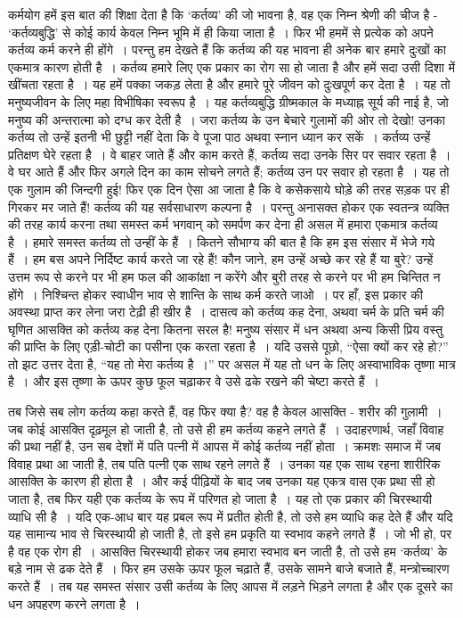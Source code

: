 कर्मयोग हमें इस बात की शिक्षा देता है कि ‘कर्तव्य’ की जो भावना है, वह एक निम्न श्रेणी की चीज है - ‘कर्तव्यबुद्धि’ से कोई कार्य केवल निम्न भूमि में ही किया जाता है~। फिर भी हममें से प्रत्येक को अपने कर्तव्य कर्म करने ही होंगे~। परन्तु हम देखते हैं कि कर्तव्य की यह भावना ही अनेक बार हमारे दुःखों का एकमात्र कारण होती है~। कर्तव्य हमारे लिए एक प्रकार का रोग सा हो जाता है और हमें सदा उसी दिशा में खींचता रहता है~। यह हमें पक्का जकड़ लेता है और हमारे पूरे जीवन को दुःखपूर्ण कर देता है~। यह तो मनुष्यजीवन के लिए महा विभीषिका स्वरूप है~। यह कर्तव्यबुद्धि ग्रीष्मकाल के मध्याह्न सूर्य की नाई है, जो मनुष्य की अन्तरात्मा को दग्ध कर देती है~। जरा कर्तव्य के उन बेचारे गुलामों की ओर तो देखो! उनका कर्तव्य तो उन्हें इतनी भी छुट्टी नहीं देता कि वे पूजा पाठ अथवा स्नान ध्यान कर सकें~। कर्तव्य उन्हें प्रतिक्षण घेरे रहता है~। वे बाहर जाते हैं और काम करते हैं, कर्तव्य सदा उनके सिर पर सवार रहता है~। वे घर आते हैं और फिर अगले दिन का काम सोचने लगते हैं; कर्तव्य उन पर सवार हो रहता है~। यह तो एक गुलाम की जिन्दगी हुई! फिर एक दिन ऐसा आ जाता है कि वे कसेकसाये घोड़े की तरह सड़क पर ही गिरकर मर जाते हैं! कर्तव्य की यह सर्वसाधारण कल्पना है~। परन्तु अनासक्त होकर एक स्वतन्त्र व्यक्ति की तरह कार्य करना तथा समस्त कर्म भगवान् को समर्पण कर देना ही असल में हमारा एकमात्र कर्तव्य है~। हमारे समस्त कर्तव्य तो उन्हीं के हैं~। कितने सौभाग्य की बात है कि हम इस संसार में भेजे गये हैं~। हम बस अपने निर्दिष्ट कार्य करते जा रहे हैं! कौन जाने, हम उन्हें अच्छे कर रहे हैं या बुरे? उन्हें उत्तम रूप से करने पर भी हम फल की आकांक्षा न करेंगे और बुरी तरह से करने पर भी हम चिन्तित न होंगे~। निश्चिन्त होकर स्वाधीन भाव से शान्ति के साथ कर्म करते जाओ~। पर हाँ, इस प्रकार की अवस्था प्राप्त कर लेना जरा टेढ़ी ही खीर है~। दासत्व को कर्तव्य कह देना, अथवा चर्म के प्रति चर्म की घृणित आसक्ति को कर्तव्य कह देना कितना सरल है! मनुष्य संसार में धन अथवा अन्य किसी प्रिय वस्तु की प्राप्ति के लिए एड़ी-चोटी का पसीना एक करता रहता है~। यदि उससे पूछो, “ऐसा क्यों कर रहे हो?” तो झट उत्तर देता है, “यह तो मेरा कर्तव्य है~।” पर असल में यह तो धन के लिए अस्वाभाविक तृष्णा मात्र है~। और इस तृष्णा के ऊपर कुछ फूल चढ़ाकर वे उसे ढके रखने की चेष्टा करते हैं~।

तब जिसे सब लोग कर्तव्य कहा करते हैं, वह फिर क्या है? वह है केवल आसक्ति - शरीर की गुलामी~। जब कोई आसक्ति दृढ़मूल हो जाती है, तो उसे ही हम कर्तव्य कहने लगते हैं~। उदाहरणार्थ, जहाँ विवाह की प्रथा नहीं है, उन सब देशों में पति पत्नी में आपस में कोई कर्तव्य नहीं होता~। क्रमशः समाज में जब विवाह प्रथा आ जाती है, तब पति पत्नी एक साथ रहने लगते हैं~। उनका यह एक साथ रहना शारीरिक आसक्ति के कारण ही होता है~। और कई पीढ़ियों के बाद जब उनका यह एकत्र वास एक प्रथा सी हो जाता है, तब फिर यही एक कर्तव्य के रूप में परिणत हो जाता है~। यह तो एक प्रकार की चिरस्थायी व्याधि सी है~। यदि एक-आध बार यह प्रबल रूप में प्रतीत होती है, तो उसे हम व्याधि कह देते हैं और यदि यह सामान्य भाव से चिरस्थायी हो जाती है, तो इसे हम प्रकृति या स्वभाव कहने लगते हैं~। जो भी हो, पर है वह एक रोग ही~। आसक्ति चिरस्थायी होकर जब हमारा स्वभाव बन जाती है, तो उसे हम ‘कर्तव्य’ के बड़े नाम से ढक देते हैं~। फिर हम उसके ऊपर फूल चढ़ाते हैं, उसके सामने बाजे बजाते हैं, मन्त्रोच्चारण करते हैं~। तब यह समस्त संसार उसी कर्तव्य के लिए आपस में लड़ने भिड़ने लगता है और एक दूसरे का धन अपहरण करने लगता है~।

